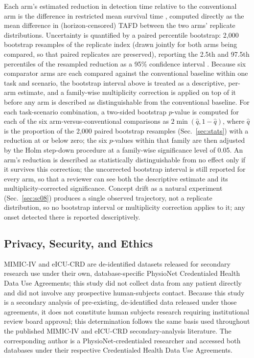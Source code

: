\documentclass[apajournal,article,submit,oneauthor]{Definitions/mdpi}
\begin{document}
Each arm's estimated reduction in detection time relative to the conventional arm is the difference in restricted mean survival time \citep{royston2013}, computed directly as the mean difference in (horizon-censored) TAFD between the two arms' replicate distributions. Uncertainty is quantified by a paired percentile bootstrap: 2{,}000 bootstrap resamples of the replicate index (drawn jointly for both arms being compared, so that paired replicates are preserved), reporting the 2.5th and 97.5th percentiles of the resampled reduction as a 95\% confidence interval \citep{efron1979}. Because six comparator arms are each compared against the conventional baseline within one task and scenario, the bootstrap interval above is treated as a descriptive, per-arm estimate, and a family-wise multiplicity correction is applied on top of it before any arm is described as distinguishable from the conventional baseline. For each task-scenario combination, a two-sided bootstrap $p$-value is computed for each of the six arm-versus-conventional comparisons as $2 \min(\hat{q}, 1-\hat{q})$, where $\hat{q}$ is the proportion of the 2{,}000 paired bootstrap resamples (Sec.~\ref{sec:stats}) with a reduction at or below zero; the six $p$-values within that family are then adjusted by the Holm step-down procedure \citep{holm1979} at a family-wise significance level of 0.05. An arm's reduction is described as statistically distinguishable from no effect only if it survives this correction; the uncorrected bootstrap interval is still reported for every arm, so that a reviewer can see both the descriptive estimate and its multiplicity-corrected significance. Concept drift as a natural experiment (Sec.~\ref{sec:sc08}) produces a single observed trajectory, not a replicate distribution, so no bootstrap interval or multiplicity correction applies to it; any onset detected there is reported descriptively.

\subsection{Privacy, Security, and Ethics}

MIMIC-IV and eICU-CRD are de-identified datasets released for secondary research use under their own, database-specific PhysioNet Credentialed Health Data Use Agreements; this study did not collect data from any patient directly and did not involve any prospective human-subjects contact. Because this study is a secondary analysis of pre-existing, de-identified data released under those agreements, it does not constitute human subjects research requiring institutional review board approval; this determination follows the same basis used throughout the published MIMIC-IV and eICU-CRD secondary-analysis literature. The corresponding author is a PhysioNet-credentialed researcher and accessed both databases under their respective Credentialed Health Data Use Agreements.
\end{document}
